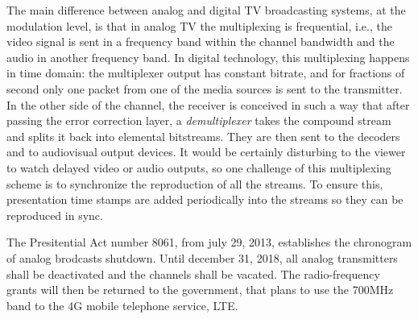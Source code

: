 \documentclass[
	12pt,				%
	openright,			%
	twoside,			%
	a4paper,			%
	brazil,
	french,				%
	english
	]{abntex2}
\begin{document}
The main difference between analog and digital TV broadcasting systems, at the modulation level, is that in analog TV the multiplexing is frequential, i.e., the video signal is sent in a frequency band within the channel bandwidth and the audio in another frequency band. In digital technology, this multiplexing happens in time domain: the multiplexer output has constant bitrate, and for fractions of second only one packet from one of the media sources is sent to the transmitter. In the other side of the channel, the receiver is conceived in such a way that after passing the error correction layer, a \textit{demultiplexer} takes the compound stream and splits it back into elemental bitstreams. They are then sent to the decoders and to audiovisual output devices. It would be certainly disturbing to the viewer to watch delayed video or audio outputs, so one challenge of this multiplexing scheme is to synchronize the reproduction of all the streams. To ensure this, presentation time stamps are added periodically into the streams so they can be reproduced in sync.


The Presitential Act number 8061\cite{decreto8061}, from july 29, 2013, establishes the chronogram of analog brodcasts shutdown. Until december 31, 2018, all analog transmitters shall be deactivated and the channels shall be vacated. The radio-frequency grants will then be returned to the government, that plans to use the 700MHz band to the 4G mobile telephone service, LTE.

\end{document}
